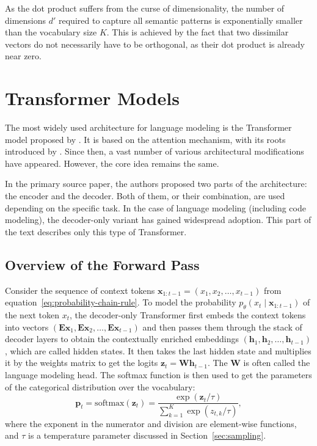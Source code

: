 As the dot product suffers from the curse of dimensionality, the number of dimensions \(d'\) required to capture all semantic patterns is exponentially smaller than the vocabulary size \(K\). This is achieved by the fact that two dissimilar vectors do not necessarily have to be orthogonal, as their dot product is already near zero.

\section{Transformer Models}

The most widely used architecture for language modeling is the Transformer model proposed by \citet{vaswani2017}. It is based on the attention mechanism, with its roots introduced by \citet{bahdanau2014}. Since then, a vast number of various architectural modifications have appeared. However, the core idea remains the same.

In the primary source paper, the authors proposed two parts of the architecture: the encoder and the decoder. Both of them, or their combination, are used depending on the specific task. In the case of language modeling (including code modeling), the decoder-only variant has gained widespread adoption. This part of the text describes only this type of Transformer.

\subsection{Overview of the Forward Pass}

Consider the sequence of context tokens \(\bm{x}_{1:t-1} = (x_1, x_2, \ldots, x_{t-1})\) from equation~\ref{eq:probability-chain-rule}. To model the probability \(p_{\theta}(x_t \mid \bm{x}_{1:t-1})\) of the next token \(x_t\), the decoder-only Transformer first embeds the context tokens into vectors \((\mathbf{Ex}_1, \mathbf{Ex}_2, \ldots, \mathbf{Ex}_{t-1})\) and then passes them through the stack of decoder layers to obtain the contextually enriched embeddings \((\mathbf{h}_1, \mathbf{h}_2, \ldots, \mathbf{h}_{t-1})\), which are called hidden states. It then takes the last hidden state and multiplies it by the weights matrix to get the logits \(\mathbf{z}_t = \mathbf{Wh}_{t-1}\). The \(\mathbf{W}\) is often called the language modeling head. The softmax function is then used to get the parameters of the categorical distribution over the vocabulary:
\begin{equation}\label{eq:softmax}
    \mathbf{p}_t = \mathrm{softmax}(\mathbf{z}_t) = \frac{\exp(\mathbf{z}_t / \tau)}{\sum_{k=1}^{K} \exp(z_{t,k} / \tau)},
\end{equation}
where the exponent in the numerator and division are element-wise functions, and \(\tau\) is a temperature parameter discussed in Section~\ref{sec:sampling}.

